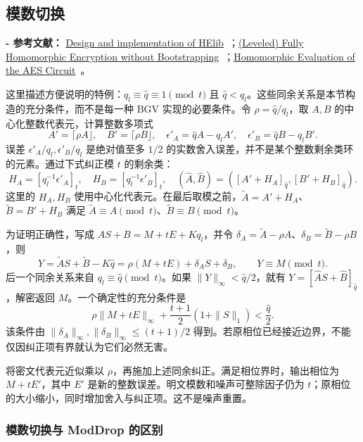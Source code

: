 \subsection{模数切换}
\label{subsec:bgv-modulus-switch}

\noindent \textbf{- 参考文献：} \href{https://eprint.iacr.org/2020/1481}{Design and implementation of HElib}~\cite{bgv-modswitch1}；\href{https://eprint.iacr.org/2011/277.pdf}{(Leveled) Fully Homomorphic Encryption without Bootstrapping}~\cite{bgv-modswitch2}；\href{https://eprint.iacr.org/2012/099.pdf}{Homomorphic Evaluation of the AES Circuit}~\cite{bgv-modswitch3}。

这里描述方便说明的特例：$q_l\equiv\widehat q\equiv1\pmod t$ 且 $\widehat q<q_l$。这些同余关系是本节构造的充分条件，而不是每一种 BGV 实现的必要条件。令 $\rho=\widehat q/q_l$，取 $A,B$ 的中心化整数代表元，计算整数多项式
\[
A'=\lceil\rho A\rfloor,\quad B'=\lceil\rho B\rfloor,\quad
\epsilon'_A=\widehat qA-q_lA',\quad\epsilon'_B=\widehat qB-q_lB'.
\]
误差 $\epsilon'_A/q_l,\epsilon'_B/q_l$ 是绝对值至多 $1/2$ 的实数舍入误差，并不是某个整数剩余类环的元素。通过下式纠正模 $t$ 的剩余类：
\[
H_A=[q_l^{-1}\epsilon'_A]_t,\quad H_B=[q_l^{-1}\epsilon'_B]_t,
\quad (\widehat A,\widehat B)=([A'+H_A]_{\widehat q},[B'+H_B]_{\widehat q}).
\]
这里的 $H_A,H_B$ 使用中心化代表元。在最后取模之前，$\widetilde A=A'+H_A$、$\widetilde B=B'+H_B$ 满足 $\widetilde A\equiv A\pmod t$、$\widetilde B\equiv B\pmod t$。

为证明正确性，写成 $AS+B=M+tE+Kq_l$，并令 $\delta_A=\widetilde A-\rho A$、$\delta_B=\widetilde B-\rho B$，则
\[
Y=\widetilde AS+\widetilde B-K\widehat q
=\rho(M+tE)+\delta_AS+\delta_B,
\qquad Y\equiv M\pmod t.
\]
后一个同余关系来自 $q_l\equiv\widehat q\pmod t$。如果 $\|Y\|_\infty<\widehat q/2$，就有 $Y=[\widehat AS+\widehat B]_{\widehat q}$，解密返回 $M$。一个确定性的充分条件是
\[
\rho\|M+tE\|_\infty+\frac{t+1}{2}(1+\|S\|_1)<\frac{\widehat q}{2}.
\]
该条件由 $\|\delta_A\|_\infty,\|\delta_B\|_\infty\leq(t+1)/2$ 得到。若原相位已经接近边界，不能仅因纠正项有界就认为它们必然无害。

\begin{tcolorbox}[title={\textbf{\tboxlabel{\ref*{subsec:bgv-modulus-switch}} BGV 模数切换}}]
将密文代表元近似乘以 $\rho$，再施加上述同余纠正。满足相位界时，输出相位为 $M+tE'$，其中 $E'$ 是新的整数误差。明文模数和噪声可整除因子仍为 $t$；原相位的大小缩小，同时增加舍入与纠正项。这不是噪声重置。
\end{tcolorbox}

\subsubsection{模数切换与 \textsf{ModDrop} 的区别}
\label{subsubsec:bgv-moddrop-vs-modswitch}


